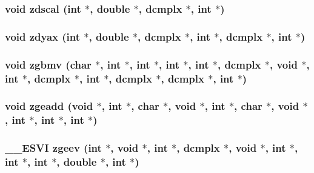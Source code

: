 \subsubsection{\setlength{\rightskip}{0pt plus 5cm}void zdscal (int $\ast$, double $\ast$, {\bf dcmplx} $\ast$, int $\ast$)}\label{essl_8h_4666d75d6a5a213a2a614a334e9427dd}


\subsubsection{\setlength{\rightskip}{0pt plus 5cm}void zdyax (int $\ast$, double $\ast$, {\bf dcmplx} $\ast$, int $\ast$, {\bf dcmplx} $\ast$, int $\ast$)}\label{essl_8h_73edd106e5d3e5ee8b095d73cec7a142}


\subsubsection{\setlength{\rightskip}{0pt plus 5cm}void zgbmv (char $\ast$, int $\ast$, int $\ast$, int $\ast$, int $\ast$, {\bf dcmplx} $\ast$, void $\ast$, int $\ast$, {\bf dcmplx} $\ast$, int $\ast$, {\bf dcmplx} $\ast$, {\bf dcmplx} $\ast$, int $\ast$)}\label{essl_8h_ce2c2278e78a1406bcbadcc8f4f77c03}


\subsubsection{\setlength{\rightskip}{0pt plus 5cm}void zgeadd (void $\ast$, int $\ast$, char $\ast$, void $\ast$, int $\ast$, char $\ast$, void $\ast$, int $\ast$, int $\ast$, int $\ast$)}\label{essl_8h_dd292edd6f8825e350d482fd237b9b0e}


\subsubsection{\setlength{\rightskip}{0pt plus 5cm}\_\-\_\-ESVI zgeev (int $\ast$, void $\ast$, int $\ast$, {\bf dcmplx} $\ast$, void $\ast$, int $\ast$, int $\ast$, int $\ast$, double $\ast$, int $\ast$)}\label{essl_8h_fd061cea8fc913c4207fd155b8065999}


